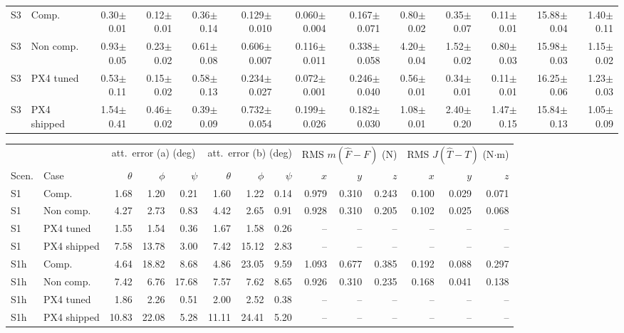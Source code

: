 \begin{tabular}{llrrrrrrrrrrr}
S3 & Comp. & 0.30$\pm$0.01 & 0.12$\pm$0.01 & 0.36$\pm$0.14 & 0.129$\pm$0.010 & 0.060$\pm$0.004 & 0.167$\pm$0.071 & 0.80$\pm$0.02 & 0.35$\pm$0.07 & 0.11$\pm$0.01 & 15.88$\pm$0.04 & 1.40$\pm$0.11 \\
S3 & Non comp. & 0.93$\pm$0.05 & 0.23$\pm$0.02 & 0.61$\pm$0.08 & 0.606$\pm$0.007 & 0.116$\pm$0.011 & 0.338$\pm$0.058 & 4.20$\pm$0.04 & 1.52$\pm$0.02 & 0.80$\pm$0.03 & 15.98$\pm$0.03 & 1.15$\pm$0.02 \\
S3 & PX4 tuned & 0.53$\pm$0.11 & 0.15$\pm$0.02 & 0.58$\pm$0.13 & 0.234$\pm$0.027 & 0.072$\pm$0.001 & 0.246$\pm$0.040 & 0.56$\pm$0.01 & 0.34$\pm$0.01 & 0.11$\pm$0.01 & 16.25$\pm$0.06 & 1.23$\pm$0.03 \\
S3 & PX4 shipped & 1.54$\pm$0.41 & 0.46$\pm$0.02 & 0.39$\pm$0.09 & 0.732$\pm$0.054 & 0.199$\pm$0.026 & 0.182$\pm$0.030 & 1.08$\pm$0.01 & 2.40$\pm$0.20 & 1.47$\pm$0.15 & 15.84$\pm$0.13 & 1.05$\pm$0.09 \\
\bottomrule
\end{tabular}

\begin{tabular}{llrrrrrrrrrrrr}
\toprule
 & & \multicolumn{3}{c}{att.\ error (a) (deg)} & \multicolumn{3}{c}{att.\ error (b) (deg)} & \multicolumn{3}{c}{RMS $m(\hat F - F)$ (N)} & \multicolumn{3}{c}{RMS $J(\hat T - T)$ (N$\cdot$m)} \\
\cmidrule(lr){3-5}\cmidrule(lr){6-8}\cmidrule(lr){9-11}\cmidrule(lr){12-14}
Scen. & Case & $\theta$ & $\phi$ & $\psi$ & $\theta$ & $\phi$ & $\psi$ & $x$ & $y$ & $z$ & $x$ & $y$ & $z$ \\
\midrule
S1 & Comp. & 1.68 & 1.20 & 0.21 & 1.60 & 1.22 & 0.14 & 0.979 & 0.310 & 0.243 & 0.100 & 0.029 & 0.071 \\
S1 & Non comp. & 4.27 & 2.73 & 0.83 & 4.42 & 2.65 & 0.91 & 0.928 & 0.310 & 0.205 & 0.102 & 0.025 & 0.068 \\
S1 & PX4 tuned & 1.55 & 1.54 & 0.36 & 1.67 & 1.58 & 0.26 & -- & -- & -- & -- & -- & -- \\
S1 & PX4 shipped & 7.58 & 13.78 & 3.00 & 7.42 & 15.12 & 2.83 & -- & -- & -- & -- & -- & -- \\
S1h & Comp. & 4.64 & 18.82 & 8.68 & 4.86 & 23.05 & 9.59 & 1.093 & 0.677 & 0.385 & 0.192 & 0.088 & 0.297 \\
S1h & Non comp. & 7.42 & 6.76 & 17.68 & 7.57 & 7.62 & 8.65 & 0.926 & 0.310 & 0.235 & 0.168 & 0.041 & 0.138 \\
S1h & PX4 tuned & 1.86 & 2.26 & 0.51 & 2.00 & 2.52 & 0.38 & -- & -- & -- & -- & -- & -- \\
S1h & PX4 shipped & 10.83 & 22.08 & 5.28 & 11.11 & 24.41 & 5.20 & -- & -- & -- & -- & -- & -- \\
\bottomrule
\end{tabular}

